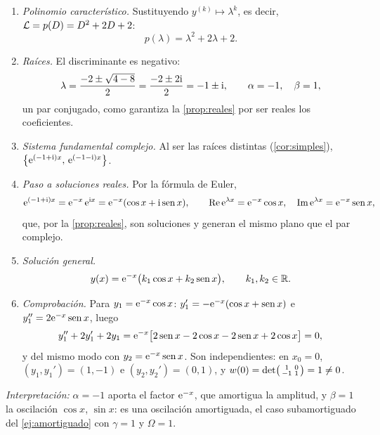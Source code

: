 \begin{ejemplo}[$y''+2y'+2y=0$ \cite{TEMARIO}]\label{ej:complejas}
\leavevmode
\begin{enumerate}[label=\textcolor{cian}{\arabic*.}, leftmargin=1.5em, itemsep=4pt]
  \item \emph{Polinomio característico.} Sustituyendo $y^{(k)}\mapsto\lambda^{k}$, es decir,
        $\mathcal{L}=p(D)=D^{2}+2D+2$:
        \[
          p(\lambda)=\lambda^{2}+2\lambda+2 .
        \]
  \item \emph{Raíces.} El discriminante es negativo:
        \[
          \lambda=\frac{-2\pm\sqrt{4-8}}{2}=\frac{-2\pm2\mathrm{i}}{2}=-1\pm\mathrm{i} ,
          \qquad \alpha=-1,\quad \beta=1 ,
        \]
        un par conjugado, como garantiza la \cref{prop:reales} por ser reales
        los coeficientes.
  \item \emph{Sistema fundamental complejo.} Al ser las raíces distintas
        (\cref{cor:simples}), $\bigl\{\mathrm{e}^{(-1+\mathrm{i})x},\,\mathrm{e}^{(-1-\mathrm{i})x}\bigr\}$.
  \item \emph{Paso a soluciones reales.} Por la fórmula de Euler,
        \[
          \mathrm{e}^{(-1+\mathrm{i})x}=\mathrm{e}^{-x}\,\mathrm{e}^{\mathrm{i} x}=\mathrm{e}^{-x}(\cos x+\mathrm{i}\operatorname{sen} x),
          \qquad
          \operatorname{Re}\mathrm{e}^{\lambda x}=\mathrm{e}^{-x}\cos x,\quad \operatorname{Im}\mathrm{e}^{\lambda x}=\mathrm{e}^{-x}\operatorname{sen} x ,
        \]
        que, por la \cref{prop:reales}, son soluciones y generan el mismo
        plano que el par complejo.
  \item \emph{Solución general.}
        \begin{equation}\label{eq:ej-complejas}
          y(x)=\mathrm{e}^{-x}\bigl(k_1\cos x+k_2\operatorname{sen} x\bigr),\qquad k_1,k_2\in\mathbb{R} .
        \end{equation}
  \item \emph{Comprobación.} Para $y_1=\mathrm{e}^{-x}\cos x$:
        $y_1'=-\mathrm{e}^{-x}(\cos x+\operatorname{sen} x)$ e $y_1''=2\mathrm{e}^{-x}\operatorname{sen} x$, luego
        \[
          y_1''+2y_1'+2y_1=\mathrm{e}^{-x}\bigl[2\operatorname{sen} x-2\cos x-2\operatorname{sen} x+2\cos x\bigr]=0 ,
        \]
        y del mismo modo con $y_2=\mathrm{e}^{-x}\operatorname{sen} x$. Son independientes: en
        $x_0=0$, $(y_1,y_1')=(1,-1)$ e $(y_2,y_2')=(0,1)$, y
        $w(0)=\det\begin{psmallmatrix}1&0\\-1&1\end{psmallmatrix}=1\neq0$.
\end{enumerate}
\emph{Interpretación:} $\alpha=-1$ aporta el factor $\mathrm{e}^{-x}$, que amortigua
la amplitud, y $\beta=1$ la oscilación $\cos x$, $\sin x$: es una oscilación
amortiguada, el caso subamortiguado del \cref{ej:amortiguado} con
$\gamma=1$ y $\Omega=1$.
\end{ejemplo}


